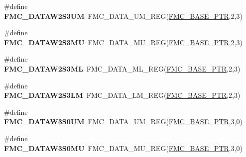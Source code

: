 \begin{DoxyCompactItemize}
\item 
\hypertarget{group___f_m_c___register___accessor___macros_ga600aad2eeceb930cb73a0c738351e8b5}{}\#define {\bfseries F\+M\+C\+\_\+\+D\+A\+T\+A\+W2\+S3\+U\+M}~F\+M\+C\+\_\+\+D\+A\+T\+A\+\_\+\+U\+M\+\_\+\+R\+E\+G(\hyperlink{group___f_m_c___peripheral_ga0a740437b573e32e6b932bf729485fd9}{F\+M\+C\+\_\+\+B\+A\+S\+E\+\_\+\+P\+T\+R},2,3)\label{group___f_m_c___register___accessor___macros_ga600aad2eeceb930cb73a0c738351e8b5}

\item 
\hypertarget{group___f_m_c___register___accessor___macros_ga7ab6e16c05eb1a78d22e8149263334ae}{}\#define {\bfseries F\+M\+C\+\_\+\+D\+A\+T\+A\+W2\+S3\+M\+U}~F\+M\+C\+\_\+\+D\+A\+T\+A\+\_\+\+M\+U\+\_\+\+R\+E\+G(\hyperlink{group___f_m_c___peripheral_ga0a740437b573e32e6b932bf729485fd9}{F\+M\+C\+\_\+\+B\+A\+S\+E\+\_\+\+P\+T\+R},2,3)\label{group___f_m_c___register___accessor___macros_ga7ab6e16c05eb1a78d22e8149263334ae}

\item 
\hypertarget{group___f_m_c___register___accessor___macros_ga6b885ea8155d43705ca1911f0c97c7d0}{}\#define {\bfseries F\+M\+C\+\_\+\+D\+A\+T\+A\+W2\+S3\+M\+L}~F\+M\+C\+\_\+\+D\+A\+T\+A\+\_\+\+M\+L\+\_\+\+R\+E\+G(\hyperlink{group___f_m_c___peripheral_ga0a740437b573e32e6b932bf729485fd9}{F\+M\+C\+\_\+\+B\+A\+S\+E\+\_\+\+P\+T\+R},2,3)\label{group___f_m_c___register___accessor___macros_ga6b885ea8155d43705ca1911f0c97c7d0}

\item 
\hypertarget{group___f_m_c___register___accessor___macros_gaa583c64708c5d4a57e56191f88a9e55c}{}\#define {\bfseries F\+M\+C\+\_\+\+D\+A\+T\+A\+W2\+S3\+L\+M}~F\+M\+C\+\_\+\+D\+A\+T\+A\+\_\+\+L\+M\+\_\+\+R\+E\+G(\hyperlink{group___f_m_c___peripheral_ga0a740437b573e32e6b932bf729485fd9}{F\+M\+C\+\_\+\+B\+A\+S\+E\+\_\+\+P\+T\+R},2,3)\label{group___f_m_c___register___accessor___macros_gaa583c64708c5d4a57e56191f88a9e55c}

\item 
\hypertarget{group___f_m_c___register___accessor___macros_ga4e0ad9ed74e949eccca99305c3a169ae}{}\#define {\bfseries F\+M\+C\+\_\+\+D\+A\+T\+A\+W3\+S0\+U\+M}~F\+M\+C\+\_\+\+D\+A\+T\+A\+\_\+\+U\+M\+\_\+\+R\+E\+G(\hyperlink{group___f_m_c___peripheral_ga0a740437b573e32e6b932bf729485fd9}{F\+M\+C\+\_\+\+B\+A\+S\+E\+\_\+\+P\+T\+R},3,0)\label{group___f_m_c___register___accessor___macros_ga4e0ad9ed74e949eccca99305c3a169ae}

\item 
\hypertarget{group___f_m_c___register___accessor___macros_gaa3a87fa94f7ea445c15524e55cb68394}{}\#define {\bfseries F\+M\+C\+\_\+\+D\+A\+T\+A\+W3\+S0\+M\+U}~F\+M\+C\+\_\+\+D\+A\+T\+A\+\_\+\+M\+U\+\_\+\+R\+E\+G(\hyperlink{group___f_m_c___peripheral_ga0a740437b573e32e6b932bf729485fd9}{F\+M\+C\+\_\+\+B\+A\+S\+E\+\_\+\+P\+T\+R},3,0)\label{group___f_m_c___register___accessor___macros_gaa3a87fa94f7ea445c15524e55cb68394}


\end{DoxyCompactItemize}
